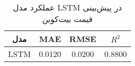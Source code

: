 
        \begin{table}[h]
            \centering
            \begin{tabular}{cccc}
                \toprule
                \textbf{مدل} & \textbf{MAE} & \textbf{RMSE} & \textbf{ \(R^2\) } \\
                \midrule
                LSTM & 0.0120 & 0.0200 & 0.8800 \\
                \bottomrule
            \end{tabular}
            \caption{عملکرد مدل LSTM در پیش‌بینی قیمت بیت‌کوین}
            \label{tab:lstm_performance}
        \end{table}
        
